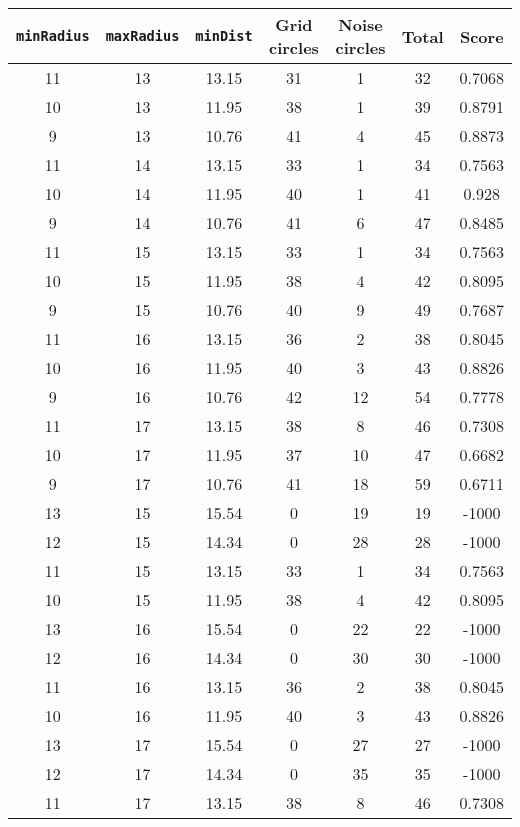 \documentclass[letterpaper, 12pt]{article}
\begin{document}
\begin{longtable}{|c|c|c|c|c|c|c|}
\hline
\textbf{\texttt{minRadius}} & \textbf{\texttt{maxRadius}} & \textbf{\texttt{minDist}} & \textbf{Grid circles} & \textbf{Noise circles} & \textbf{Total} & \textbf{Score} \\
\hline
11 & 13 & 13.15 & 31 & 1 & 32 & 0.7068 \\
\hline
10 & 13 & 11.95 & 38 & 1 & 39 & 0.8791 \\
\hline
9 & 13 & 10.76 & 41 & 4 & 45 & 0.8873 \\
\hline
11 & 14 & 13.15 & 33 & 1 & 34 & 0.7563 \\
\hline
10 & 14 & 11.95 & 40 & 1 & 41 & 0.928 \\
\hline
9 & 14 & 10.76 & 41 & 6 & 47 & 0.8485 \\
\hline
11 & 15 & 13.15 & 33 & 1 & 34 & 0.7563 \\
\hline
10 & 15 & 11.95 & 38 & 4 & 42 & 0.8095 \\
\hline
9 & 15 & 10.76 & 40 & 9 & 49 & 0.7687 \\
\hline
11 & 16 & 13.15 & 36 & 2 & 38 & 0.8045 \\
\hline
10 & 16 & 11.95 & 40 & 3 & 43 & 0.8826 \\
\hline
9 & 16 & 10.76 & 42 & 12 & 54 & 0.7778 \\
\hline
11 & 17 & 13.15 & 38 & 8 & 46 & 0.7308 \\
\hline
10 & 17 & 11.95 & 37 & 10 & 47 & 0.6682 \\
\hline
9 & 17 & 10.76 & 41 & 18 & 59 & 0.6711 \\
\hline
13 & 15 & 15.54 & 0 & 19 & 19 & -1000 \\
\hline
12 & 15 & 14.34 & 0 & 28 & 28 & -1000 \\
\hline
11 & 15 & 13.15 & 33 & 1 & 34 & 0.7563 \\
\hline
10 & 15 & 11.95 & 38 & 4 & 42 & 0.8095 \\
\hline
13 & 16 & 15.54 & 0 & 22 & 22 & -1000 \\
\hline
12 & 16 & 14.34 & 0 & 30 & 30 & -1000 \\
\hline
11 & 16 & 13.15 & 36 & 2 & 38 & 0.8045 \\
\hline
10 & 16 & 11.95 & 40 & 3 & 43 & 0.8826 \\
\hline
13 & 17 & 15.54 & 0 & 27 & 27 & -1000 \\
\hline
12 & 17 & 14.34 & 0 & 35 & 35 & -1000 \\
\hline
11 & 17 & 13.15 & 38 & 8 & 46 & 0.7308 \\
\hline

\end{longtable}
\end{document}
